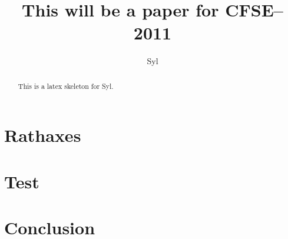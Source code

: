 \documentclass[a4paper,twocolumn]{article}
\author{Syl}
\title{This will be a paper for CFSE--2011}
\begin{document}
\maketitle

\begin{abstract}
This is a latex skeleton for Syl.
\end{abstract}

\section{Rathaxes}

\lipsum[1]

\section{Test}

\lipsum[2]

\section{Conclusion}

\lipsum[3]
\end{document}
